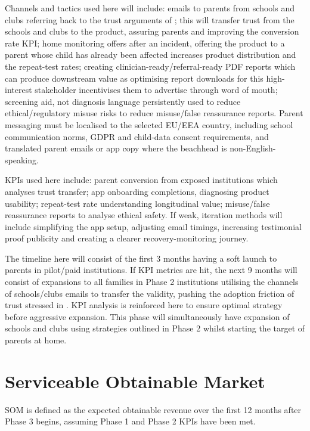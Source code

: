 Channels and tactics used here will include: emails to parents from schools and clubs referring back to the trust arguments of ; this will transfer trust from the schools and clubs to the product, assuring parents and improving the conversion rate KPI; home monitoring offers after an incident, offering the product to a parent whose child has already been affected increases product distribution and the repeat-test rates; creating clinician-ready/referral-ready PDF reports which can produce downstream value as optimising report downloads for this high-interest stakeholder incentivises them to advertise through word of mouth; screening aid, not diagnosis language persistently used to reduce ethical/regulatory misuse risks to reduce misuse/false reassurance reports. Parent messaging must be localised to the selected EU/EEA country, including school communication norms, GDPR and child-data consent requirements, and translated parent emails or app copy where the beachhead is non-English-speaking.

KPIs used here include: parent conversion from exposed institutions which analyses trust transfer; app onboarding completions, diagnosing product usability; repeat-test rate understanding longitudinal value; misuse/false reassurance reports to analyse ethical safety. If weak, iteration methods will include simplifying the app setup, adjusting email timings, increasing testimonial proof publicity and creating a clearer recovery-monitoring journey.

The timeline here will consist of the first 3 months having a soft launch to parents in pilot/paid institutions. If KPI metrics are hit, the next 9 months will consist of expansions to all families in Phase 2 institutions utilising the channels of schools/clubs emails to transfer the validity, pushing the adoption friction of trust stressed in . KPI analysis is reinforced here to ensure optimal strategy before aggressive expansion. This phase will simultaneously have expansion of schools and clubs using strategies outlined in Phase 2 whilst starting the target of parents at home.


\section{Serviceable Obtainable Market}
\label{sec:ent-som}

SOM is defined as the expected obtainable revenue over the first 12 months after Phase 3 begins, assuming Phase 1 and Phase 2 KPIs have been met.


